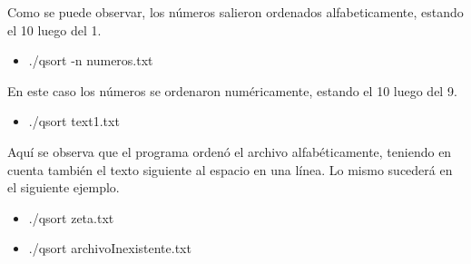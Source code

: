 \documentclass[a4paper,10pt]{article}
\numberwithin{equation}{section}
\numberwithin{figure}{section}
\begin{document}
Como se puede observar, los números salieron ordenados alfabeticamente, estando el 10 luego del 1.

\begin{itemize}
\item  ./qsort -n numeros.txt 
\end{itemize}
\noindent{}

En este caso los números se ordenaron numéricamente, estando el 10 luego del 9.

\begin{itemize}
\item  ./qsort text1.txt 
\end{itemize}
\noindent{}

Aquí se observa que el programa ordenó el archivo alfabéticamente, teniendo en cuenta también el texto siguiente al espacio en una línea. Lo mismo sucederá en el siguiente ejemplo.

\begin{itemize}
\item  ./qsort zeta.txt 
\end{itemize}
\noindent{}


\begin{itemize}
\item  ./qsort archivoInexistente.txt 
\end{itemize}
\noindent{}
\end{document}
